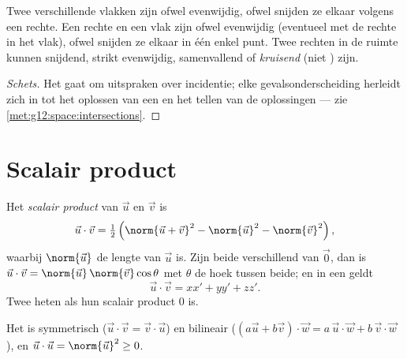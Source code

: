 \begin{proposition}\label{prop:g12:space:positions}
Twee verschillende vlakken zijn ofwel evenwijdig, ofwel snijden ze elkaar
volgens een rechte. Een rechte en een vlak zijn ofwel evenwijdig (eventueel
met de rechte in het vlak), ofwel snijden ze elkaar in één enkel punt. Twee
rechten in de ruimte kunnen snijdend, strikt evenwijdig, samenvallend of
\emph{kruisend} (niet ) zijn.
\end{proposition}

\begin{proof}[Schets]
Het gaat om uitspraken over incidentie; elke gevalsonderscheiding herleidt
zich in  tot het oplossen van een  en het tellen van
de oplossingen --- zie \cref{met:g12:space:intersections}.
\end{proof}

\section{Scalair product}

\begin{definition}\label{def:g12:space:dot}
Het \emph{scalair product} van $\vec u$ en $\vec v$ is
\[
\vec u \cdot \vec v = \tfrac12\left(\norm{\vec u + \vec v}^2
- \norm{\vec u}^2 - \norm{\vec v}^2\right),
\]
waarbij $\norm{\vec u}$ de lengte van $\vec u$ is. Zijn beide 
verschillend van $\vec 0$, dan is
$\vec u \cdot \vec v = \norm{\vec u}\,\norm{\vec v}\cos\theta$ met $\theta$ de
hoek tussen beide; en in een \emph{}  geldt
\[
\vec u \cdot \vec v = xx' + yy' + zz' .
\]
Twee  heten \emph{} als hun scalair product $0$ is.
\end{definition}

\begin{proposition}[Eigenschappen]\label{prop:g12:space:dotprops}
Het  is symmetrisch ($\vec u\cdot\vec v = \vec v\cdot\vec u$)
en bilineair ($(a\vec u + b\vec v)\cdot \vec w = a\,\vec u\cdot\vec w +
b\,\vec v\cdot \vec w$), en $\vec u \cdot \vec u = \norm{\vec u}^2 \geq 0$.
\end{proposition}

